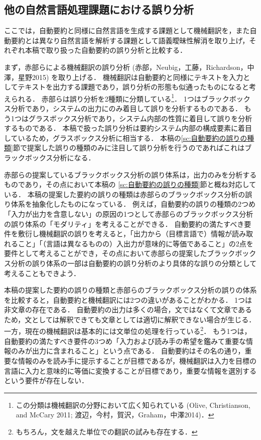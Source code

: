 \subsection{他の自然言語処理課題における誤り分析}

ここでは，自動要約と同様に自然言語を生成する課題として機械翻訳を，また自動要約とは異なり自然言語を解析する課題として語義曖昧性解消を取り上げ，それぞれ本稿で取り扱った自動要約の誤り分析と比較する．

    まず，赤部らによる機械翻訳の誤り分析 (赤部，Neubig，工藤，Richardson，中澤，星野2015) を取り上げる．\nocite{akabe15}
機械翻訳は自動要約と同様にテキストを入力としてテキストを出力する課題であり，誤り分析の形態も似通ったものになると考えられる．
赤部らは誤り分析を2種類に分類している\footnote{
    この分類は機械翻訳の分野において広く知られている (Olive, Christianson, and McCary 2011; 渡辺，今村，賀沢，Graham，中澤2014)．\nocite{olive11,watanabe14}}．
1つはブラックボックス分析であり，システムの出力にのみ着目して誤りを分析するものである．
もう1つはグラスボックス分析であり，システム内部の性質に着目して誤りを分析するものである．
本稿で扱った誤り分析は要約システム内部の構成要素に着目しているため，グラスボックス分析に相当する．
本稿の\ref{sc:自動要約の誤りの種類}節で提案した誤りの種類のみに注目して誤り分析を行うのであればこれはブラックボックス分析になる．

赤部らの提案しているブラックボックス分析の誤り体系は，出力のみを分析するものであり，その点において本稿の
\ref{sc:自動要約の誤りの種類}節と概ね対応している．
本稿の提案した要約の誤りの種類は赤部らのブラックボックス分析の誤り体系を抽象化したものになっている．
例えば，自動要約の誤りの種類の2つめ「入力が出力を含意しない」の原因の1つとして赤部らのブラックボックス分析の誤り体系の「モダリティ」を考えることができる．
自動要約の満たすべき要件を敷衍し機械翻訳の誤りを考えると，「出力から（目標言語で）情報が読み取れること」「（言語は異なるものの）入出力が意味的に等価であること」の2点を要件として考えることができ，その点において赤部らの提案したブラックボックス分析の誤り体系の一部は自動要約の誤り分析のより具体的な誤りの分類として考えることもできよう．

本稿の提案した要約の誤りの種類と赤部らのブラックボックス分析の誤りの体系を比較すると，自動要約と機械翻訳には2つの違いがあることがわかる．
1つは非文章の存在である．
自動要約の出力は多くの場合，文ではなくて文章であるため，文としては解釈できても文章としては適切に解釈できない場合が生じる．
一方，現在の機械翻訳は基本的には文単位の処理を行っている\footnote{
もちろん，文を越えた単位での翻訳の試みも存在する\cite{christian12,xiong13}．}．
もう1つは，自動要約の満たすべき要件の3つめ「入力および読み手の希望を鑑みて重要な情報のみが出力に含まれること」という点である．
自動要約はその名の通り，重要な情報のみを読み手に提示することが目標であるが，機械翻訳は入力を目標の言語に入力と意味的に等価に変換することが目標であり，重要な情報を選別するという要件が存在しない．

